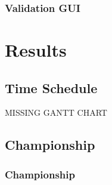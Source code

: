 \documentclass[hyperref={pdfpagelabels=false},compress]{beamer}
\begin{document}
\begin{frame}
    \frametitle{Validation GUI}
	\centering
\end{frame}

\section{Results}
\subsection{Time Schedule}
\begin{frame}
	MISSING GANTT CHART
\end{frame}

\subsection{Championship}
\begin{frame}
	\frametitle{Championship}
\end{frame}
\end{document}

